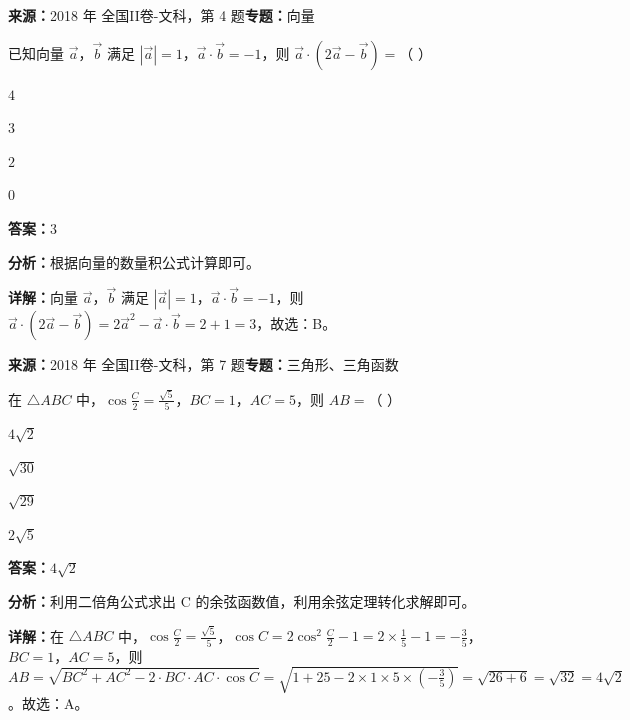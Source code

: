 \begin{question}[points=5]
\textbf{来源：}2018 年 全国II卷-文科，第 4 题\quad \textbf{专题：}向量\par
已知向量 $\vec{a}$，$\vec{b}$ 满足 $|\vec{a}|=1$，$\vec{a}\cdot\vec{b}=-1$，则 $\vec{a}\cdot(2\vec{a}-\vec{b})=$（ ）
\begin{choices}
  \item $4$
  \item $3$
  \item $2$
  \item $0$
\end{choices}
\begin{solution}
\textbf{答案：}$3$

\textbf{分析：}根据向量的数量积公式计算即可。

\textbf{详解：}向量 $\vec{a}$，$\vec{b}$ 满足 $|\vec{a}|=1$，$\vec{a}\cdot\vec{b}=-1$，则 $\vec{a}\cdot(2\vec{a}-\vec{b})=2\vec{a}^2-\vec{a}\cdot\vec{b}=2+1=3$，故选：B。
\end{solution}
\end{question}

\begin{question}[points=5]
\textbf{来源：}2018 年 全国II卷-文科，第 7 题\quad \textbf{专题：}三角形、三角函数\par
在 $\triangle ABC$ 中，$\cos\frac{C}{2}=\frac{\sqrt{5}}{5}$，$BC=1$，$AC=5$，则 $AB=$（ ）
\begin{choices}
  \item $4\sqrt{2}$
  \item $\sqrt{30}$
  \item $\sqrt{29}$
  \item $2\sqrt{5}$
\end{choices}
\begin{solution}
\textbf{答案：}$4\sqrt{2}$

\textbf{分析：}利用二倍角公式求出 C 的余弦函数值，利用余弦定理转化求解即可。

\textbf{详解：}在 $\triangle ABC$ 中，$\cos\frac{C}{2}=\frac{\sqrt{5}}{5}$，$\cos C=2\cos^2\frac{C}{2}-1=2\times\frac{1}{5}-1=-\frac{3}{5}$，$BC=1$，$AC=5$，则 $AB=\sqrt{BC^2+AC^2-2\cdot BC\cdot AC\cdot\cos C}=\sqrt{1+25-2\times1\times5\times(-\frac{3}{5})}=\sqrt{26+6}=\sqrt{32}=4\sqrt{2}$。故选：A。
\end{solution}
\end{question}

